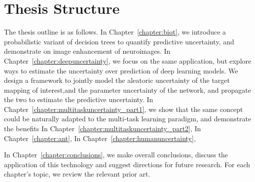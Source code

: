 \section{Thesis Structure}

The thesis outline is as follows. In Chapter~\ref{chapter:biqt}, we introduce a probabilistic variant of decision trees to quantify predictive uncertainty, and demonstrate on image enhancement of neuroimages. In Chapter~\ref{chapter:deepuncertainty}, we focus on the same application, but explore ways to estimate the uncertainty over prediction of deep learning models. We design a framework to jointly model the aleatoric uncertainty of the target mapping of interest,and the parameter uncertainty of the network, and propagate the two to estimate the predictive uncertainty. In Chapter~\ref{chapter:multitaskuncertainty_part1}, we show that the same concept could be naturally adapted to the multi-task learning paradigm, and demonstrate the benefits 
In Chapter~\ref{chapter:multitaskuncertainty_part2}, 
In Chapter~\ref{chapter:ant}, 
In Chapter~\ref{chapter:humanuncertainty}, 



 In Chapter~\ref{chapter:conclusions}, we make overall conclusions, discuss the application of this technology and suggest directions for future research. For each chapter’s topic, we review the relevant prior art. 

